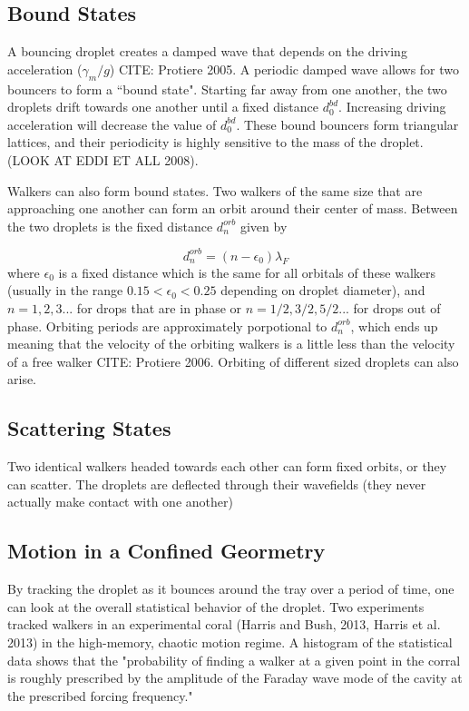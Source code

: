 	   
            \subsection{Bound States}
            A bouncing droplet creates a damped wave that depends on the driving acceleration (${\gamma_m}/ g$) CITE: Protiere 2005. A periodic damped wave allows for two bouncers to form a ``bound state".  Starting far away from one another, the two droplets drift towards one another until a fixed distance $d_{0}^{bd}$. Increasing driving acceleration will decrease the value of $d_{0}^{bd}$. These bound bouncers form triangular lattices, and their periodicity is highly sensitive to the mass of the droplet. (LOOK AT EDDI ET ALL 2008).
            
            Walkers can also form bound states. Two walkers of the same size that are approaching one another can form an orbit around their center of mass. Between the two droplets is the fixed distance $d_{n}^{orb}$ given by
            
\begin{equation} \label{orbital}
d_{n}^{orb} = (n - \epsilon_0)\lambda_F
\end{equation}         
where $\epsilon_0$ is a fixed distance which is the same for all orbitals of these walkers (usually in the range $0.15 < \epsilon_0 < 0.25$ depending on droplet diameter), and $n = 1,2,3$... for drops that are in phase or $n = 1/2, 3/2, 5/2$... for drops out of phase. Orbiting periods are approximately porpotional to $d_{n}^{orb}$, which ends up meaning that the velocity of the orbiting walkers is a little less than the velocity of a free walker CITE: Protiere 2006. Orbiting of different sized droplets can also arise.      

            \subsection{Scattering States}
            Two identical walkers headed towards each other can form fixed orbits, or they can scatter. The droplets are deflected through their wavefields (they never actually make contact with one another)            
           
\subsection{Motion in a Confined Geormetry}
By tracking the droplet as it bounces around the tray over a period of time, one can look at the overall statistical behavior of the droplet. Two experiments tracked walkers in an experimental coral (Harris and Bush, 2013, Harris et al. 2013) in the high-memory, chaotic motion regime. A histogram of the statistical data shows that the "probability of finding a walker at a given point in the corral is roughly prescribed by the amplitude of the Faraday wave mode of the cavity at the prescribed forcing frequency."

